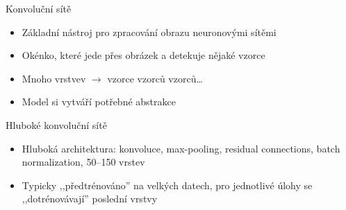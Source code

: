 \documentclass[handout,aspectratio=169,dvipsnames]{beamer}
\begin{document}

\begin{frame}{Konvoluční sítě}

    \begin{minipage}{.45\textwidth}
        \begin{itemize}[<+->]

            \item Základní nástroj pro zpracování obrazu neuronovými sítěmi

            \item Okénko, které jede přes obrázek a detekuje nějaké vzorce

            \item Mnoho vrstvev $\rightarrow$ vzorce vzorců vzorců\ldots

            \item Model si vytváří potřebné abstrakce

        \end{itemize}
    \end{minipage}\begin{minipage}{.45\textwidth}
        \centering
        \scalebox{0.7}{}
    \end{minipage}

\end{frame}


\begin{frame}{Hluboké konvoluční sítě}

    \begin{center}
        \scalebox{0.4}{}
    \end{center}

    \begin{itemize}[<+->]

        \item Hluboká architektura: konvoluce, max-pooling, residual connections,
            batch normalization, 50--150 vrstev

        \item Typicky ,,předtrénováno'' na velkých datech, pro jednotlivé úlohy
            se ,,dotrénovávají'' poslední vrstvy

    \end{itemize}

\end{frame}
\end{document}
